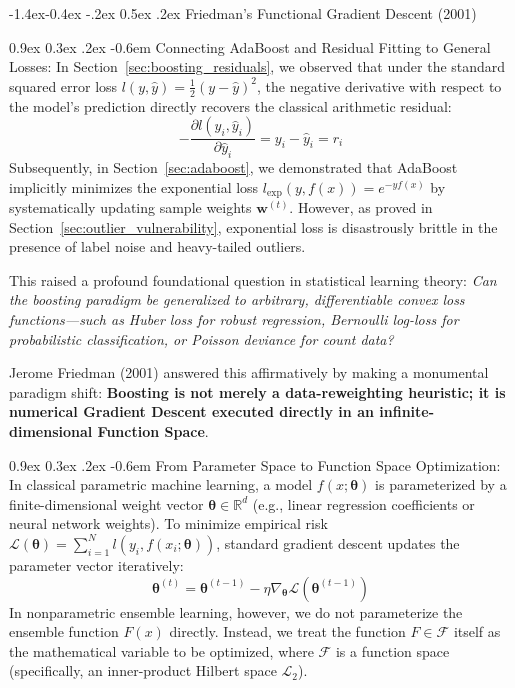 \documentclass[11pt,a4paper]{article}
\makeatletter
\renewcommand\subsection{\@startsection{subsection}{2}{\z@}%
                                     {-1.4ex\@plus -0.4ex \@minus -.2ex}%
                                     {0.5ex \@plus .2ex}%
                                     {\normalfont\normalsize\bfseries}}
\renewcommand\paragraph{\@startsection{paragraph}{4}{\z@}%
                                     {0.9ex \@plus0.3ex \@minus.2ex}%
                                     {-0.6em}%
                                     {\normalfont\normalsize\bfseries}}
\newcommand{\R}{\mathbb{R}}
\makeatother
\begin{document}
\subsection{Friedman's Functional Gradient Descent (2001)}
\label{sec:friedman_gbdt}

\paragraph{Connecting AdaBoost and Residual Fitting to General Losses:}
In Section~\ref{sec:boosting_residuals}, we observed that under the standard squared error loss $l(y, \hat{y}) = \frac{1}{2}(y - \hat{y})^2$, the negative derivative with respect to the model's prediction directly recovers the classical arithmetic residual:
\begin{equation}
    -\frac{\partial l(y_i, \hat{y}_i)}{\partial \hat{y}_i} = y_i - \hat{y}_i = r_i
\end{equation}
Subsequently, in Section~\ref{sec:adaboost}, we demonstrated that AdaBoost implicitly minimizes the exponential loss $l_{\text{exp}}(y, f(x)) = e^{-y f(x)}$ by systematically updating sample weights $\mathbf{w}^{(t)}$. However, as proved in Section~\ref{sec:outlier_vulnerability}, exponential loss is disastrously brittle in the presence of label noise and heavy-tailed outliers.

This raised a profound foundational question in statistical learning theory: \emph{Can the boosting paradigm be generalized to arbitrary, differentiable convex loss functions---such as Huber loss for robust regression, Bernoulli log-loss for probabilistic classification, or Poisson deviance for count data?}

Jerome Friedman (2001) answered this affirmatively by making a monumental paradigm shift: \textbf{Boosting is not merely a data-reweighting heuristic; it is numerical Gradient Descent executed directly in an infinite-dimensional Function Space}.

\paragraph{From Parameter Space to Function Space Optimization:}
In classical parametric machine learning, a model $f(x; \boldsymbol{\theta})$ is parameterized by a finite-dimensional weight vector $\boldsymbol{\theta} \in \R^d$ (e.g., linear regression coefficients or neural network weights). To minimize empirical risk $\mathcal{L}(\boldsymbol{\theta}) = \sum_{i=1}^N l(y_i, f(x_i; \boldsymbol{\theta}))$, standard gradient descent updates the parameter vector iteratively:
\begin{equation}
    \boldsymbol{\theta}^{(t)} = \boldsymbol{\theta}^{(t-1)} - \eta \nabla_{\boldsymbol{\theta}} \mathcal{L}(\boldsymbol{\theta}^{(t-1)})
\end{equation}
In nonparametric ensemble learning, however, we do not parameterize the ensemble function $F(x)$ directly. Instead, we treat the function $F \in \mathcal{F}$ itself as the mathematical variable to be optimized, where $\mathcal{F}$ is a function space (specifically, an inner-product Hilbert space $\mathcal{L}_2$).
\end{document}

